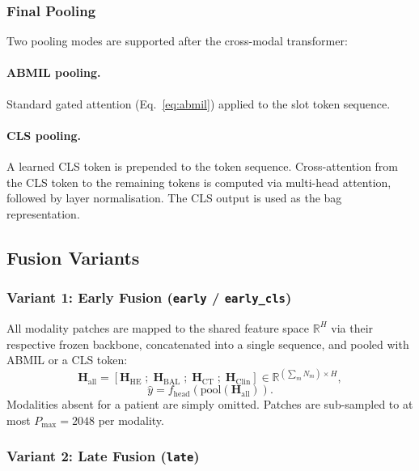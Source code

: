 \documentclass[11pt,a4paper]{article}
\begin{document}
\subsubsection{Final Pooling}

Two pooling modes are supported after the cross-modal transformer:

\paragraph{ABMIL pooling.}
Standard gated attention (Eq.~\eqref{eq:abmil}) applied to the slot token
sequence.

\paragraph{CLS pooling.}
A learned CLS token is prepended to the token sequence.
Cross-attention from the CLS token to the remaining tokens is computed via
multi-head attention, followed by layer normalisation.
The CLS output is used as the bag representation.

\subsection{Fusion Variants}

\subsubsection{Variant 1: Early Fusion (\texttt{early} / \texttt{early\_cls})}

All modality patches are mapped to the shared feature space $\mathbb{R}^H$
via their respective frozen backbone, concatenated into a single sequence, and
pooled with ABMIL or a CLS token:
\begin{equation}
    \mathbf{H}_\text{all} = \left[\mathbf{H}_\text{HE}\;;\;\mathbf{H}_\text{BAL}\;;\;
        \mathbf{H}_\text{CT}\;;\;\mathbf{H}_\text{Clin}\right]
    \in\mathbb{R}^{(\sum_m N_m)\times H},
\end{equation}
\begin{equation}
    \hat{y} = f_\text{head}\!\left(\text{pool}(\mathbf{H}_\text{all})\right).
\end{equation}
Modalities absent for a patient are simply omitted.
Patches are sub-sampled to at most $P_\text{max}=2048$ per modality.

\subsubsection{Variant 2: Late Fusion (\texttt{late})}
\end{document}
